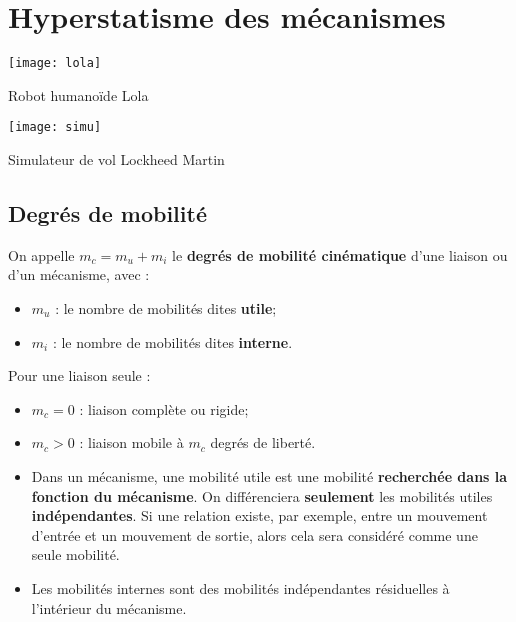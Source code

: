 \setchapterpreamble[u]{\margintoc}

\chapter{Hyperstatisme des mécanismes}




\begin{marginfigure}[4cm]
\centering
\texttt{[image: lola]}
\caption{Robot humanoïde Lola}
\end{marginfigure}

\begin{marginfigure}[8cm]
\centering
\texttt{[image: simu]}
\caption{Simulateur de vol Lockheed Martin}
\end{marginfigure}

\section{Degrés de mobilité}

	
\begin{defi}
On appelle $m_c=m_u+m_i$ le \textbf{degrés de mobilité cinématique} d'une liaison ou d'un mécanisme, avec :
\begin{itemize}
\item $m_u$ : le nombre de mobilités dites \textbf{utile};
\item $m_i$ : le nombre de mobilités dites \textbf{interne}.
\end{itemize}
\end{defi}

Pour une liaison seule :
\begin{itemize}
\item $m_c=0$ : liaison complète ou rigide;
\item $m_c>0$ : liaison mobile à $m_c$ degrés de liberté.
\end{itemize}

\begin{remarque}
\begin{itemize}
\item Dans un mécanisme, une mobilité utile est une mobilité \textbf{recherchée dans la fonction du mécanisme}.
On différenciera \textbf{seulement} les mobilités utiles \textbf{indépendantes}.
Si une relation existe, par exemple, entre un mouvement d'entrée et un mouvement de sortie, alors cela sera considéré comme une seule mobilité.
\item Les mobilités internes sont des mobilités indépendantes résiduelles à l'intérieur du mécanisme.
\end{itemize}
\end{remarque}


